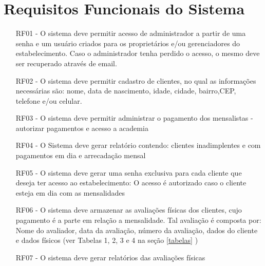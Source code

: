 





\section{Requisitos Funcionais do Sistema}
\label{secrf}
\begin{itemize}

\item[RF01 -]O sistema deve permitir acesso de administrador a partir de uma senha e um usuário criados para os proprietários e/ou gerenciadores do estabelecimento. Caso o administrador tenha perdido o acesso, o mesmo deve ser recuperado através de email.
\item[RF02 -] O sistema deve permitir cadastro de clientes, no qual as informações necessárias são: nome, data de nascimento, idade, cidade, bairro,CEP, telefone e/ou celular.
\item[RF03 -] O sistema deve permitir administrar o pagamento dos mensalistas - autorizar pagamentos e acesso a academia
\item[RF04 -] O Sistema deve gerar relatório contendo: clientes inadimplentes e com pagamentos em dia e arrecadação mensal
\item[RF05 -] O sistema deve gerar uma senha exclusiva para cada cliente que deseja ter acesso ao estabelecimento: O acesso é autorizado caso o cliente esteja em dia com as mensalidades
\item[RF06 -] O sistema deve armazenar as avaliações físicas dos clientes, cujo pagamento é a parte em relação a mensalidade. Tal avaliação é composta por: Nome do avaliador, data da avaliação, número da avaliação, dados do cliente e dados físicos (ver Tabelas 1, 2, 3 e 4 na seção \ref{tabelas} ) 
\item[RF07 - ] O sistema deve gerar relatórios das avaliações físicas


\end{itemize}


